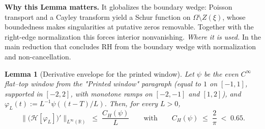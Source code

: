 \documentclass[11pt]{article}
\newtheorem{lemma}{Lemma}[section]
\theoremstyle{definition}
\theoremstyle{remark}
\begin{document}
\vspace{1.0cm}
\noindent\textbf{Why this Lemma matters.} It globalizes the boundary wedge: Poisson transport and a Cayley transform yield a Schur function on $\Omega\setminus Z(\xi)$, whose boundedness makes singularities at putative zeros removable. Together with the right-edge normalization this forces interior nonvanishing.
\noindent\textit{Where it is used.} In the main reduction that concludes RH from the boundary wedge with normalization and non-cancellation.
\begin{lemma}[Derivative envelope for the printed window]
\label{lem:CH-derivative-explicit}
Let $\psi$ be the even $C^\infty$ flat--top window from the "Printed window" paragraph (equal to $1$ on $[-1,1]$, supported in $[-2,2]$, with monotone ramps on $[-2,-1]$ and $[1,2]$), and $\varphi_L(t):=L^{-1}\psi((t-T)/L)$. Then, for every $L>0$,
\[
  \big\|\big(\mathcal H[\varphi_L]\big)'\big\|_{L^\infty(\mathbb R)} \;\le\; \frac{C_H(\psi)}{L}
  \qquad\text{with}\qquad C_H(\psi)\;\le\;\frac{2}{\pi}\;<\;0.65.
\]
\end{lemma}
\end{document}
